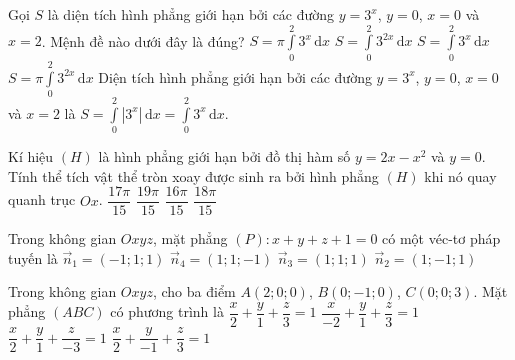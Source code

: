 \begin{ex}%
	Gọi $S$ là diện tích hình phẳng giới hạn bởi các đường $y=3^x$, $y=0$, $x=0$ và $x=2$. Mệnh đề nào dưới đây là đúng?
	\choice
	{$S=\pi \displaystyle\int\limits_{0}^{2}{3^x}\mathrm{\,d}x$}
	{$S=\displaystyle\int\limits_{0}^{2}{3^{2x}}\mathrm{\,d}x$}
	{\True $S=\displaystyle\int\limits_{0}^{2}{3^x}\mathrm{\,d}x$}
	{$S=\pi \displaystyle\int\limits_{0}^{2}{3^{2x}}\mathrm{\,d}x$}
	\loigiai
	{Diện tích hình phẳng giới hạn bởi các đường $y=3^x$, $y=0$, $x=0$ và $x=2$ là $S=\displaystyle\int\limits_{0}^{2}{\left|3^x\right |}\mathrm{\,d}x = \displaystyle\int\limits_{0}^{2}{3^x}\mathrm{\,d}x$.}
\end{ex}
\begin{ex}%
	Kí hiệu $(H)$ là hình phẳng giới hạn bởi đồ thị hàm số $y=2x-x^2$ và $y=0$. Tính thể tích vật thể tròn xoay được sinh ra bởi hình phẳng $(H)$ khi nó quay quanh trục $Ox$.
	\choice
	{$\dfrac{17\pi}{15}$}
	{$\dfrac{19\pi}{15}$}
	{\True $\dfrac{16\pi}{15}$}
	{$\dfrac{18\pi}{15}$}
\end{ex}
\begin{ex}%
	Trong không gian $Oxyz$, mặt phẳng $(P)\colon x + y + z +1=0$ có một véc-tơ pháp tuyến là
	\choice
	{$\overrightarrow{n}_1=(-1;1;1)$}
	{$\overrightarrow{n}_4=(1;1;-1)$}
	{\True $\overrightarrow{n}_3=(1;1;1)$}
	{$\overrightarrow{n}_2=(1;-1;1)$}
\end{ex}
\begin{ex}%
	Trong không gian $Oxyz$, cho ba điểm $A(2;0;0)$, $B(0;-1;0)$, $C(0;0;3)$. Mặt phẳng $(ABC)$ có phương trình là
	\choice
	{$\dfrac{x}{2}+\dfrac{y}{1}+\dfrac{z}{3}=1$}
	{$\dfrac{x}{-2}+\dfrac{y}{1}+\dfrac{z}{3}=1$}
	{$\dfrac{x}{2}+\dfrac{y}{1}+\dfrac{z}{-3}=1$}
	{\True $\dfrac{x}{2}+\dfrac{y}{-1}+\dfrac{z}{3}=1$}
\end{ex}
